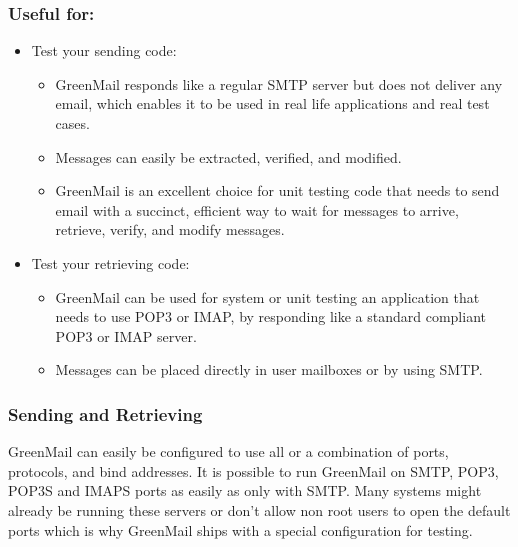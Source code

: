 \subsubsection{Useful for:}
\begin{itemize}
\item{}Test your sending code: 
\begin{itemize}
\item{}GreenMail responds like a regular SMTP server but does not deliver any email, which enables it to be used in real life applications and real test cases. 
\item{}Messages can easily be extracted, verified, and modified. 
\item{}GreenMail is an excellent choice for unit testing code that needs to send email with a succinct, efficient way to wait for messages to arrive, retrieve, verify, and modify messages. 
\end{itemize}
\item{}Test your retrieving code: 
\begin{itemize}
\item{}GreenMail can be used for system or unit testing an application that needs to use POP3 or IMAP, by responding like a standard compliant POP3 or IMAP server. 
\item{}Messages can be placed directly in user mailboxes or by using SMTP.
\end{itemize}
\end{itemize}

\subsubsection{Sending and Retrieving}
GreenMail can easily be configured to use all or a combination of ports, protocols, and bind addresses. It  is possible to run GreenMail on SMTP, POP3, POP3S and IMAPS ports as easily as only with SMTP. Many systems might already be running these servers or don’t allow non root users to open the default ports which is why GreenMail ships with a special configuration for testing.